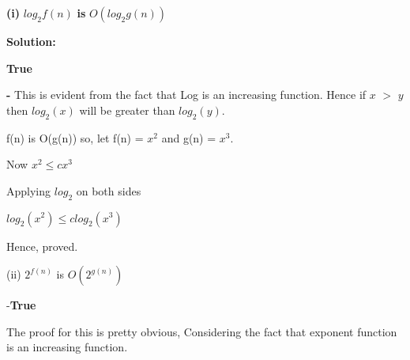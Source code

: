 \documentclass[letterpaper,portrait,12pt]{article}
\begin{document}
\begin{flushleft}
\textbf{(i) }$log_2 f(n)$\textbf{ is }$O(log_2g(n))$
\end{flushleft}


\begin{flushleft}
\textbf{S}\textbf{olution}\textbf{:}
\end{flushleft}


\begin{flushleft}
\textbf{True}
\end{flushleft}


\begin{flushleft}
\textbf{-}\textbf{ }This is evident from the fact that Log is an increasing function. Hence if $x$ $>$ $y$ then $log_2(x)$ will be greater than $log_2(y)$.
\end{flushleft}


\begin{flushleft}

\end{flushleft}


\begin{flushleft}
f(n) is O(g(n)) so, let f(n) = $x^2$ and g(n) = $x^3$.
\end{flushleft}


\begin{flushleft}

\end{flushleft}


\begin{flushleft}
Now $x^2 \le c  x^3$ 
\end{flushleft}


\begin{flushleft}
Applying $log_2$ on both sides
\end{flushleft}


\begin{flushleft}
$log_2(x^2) \le clog_2(x^3)$
\end{flushleft}


\begin{flushleft}
Hence, proved.
\end{flushleft}


\begin{flushleft}
(ii) $2^{f(n)}$ is $O(2^{g(n)})$
\end{flushleft}


\begin{flushleft}
-\textbf{True}
\end{flushleft}


\begin{flushleft}
The proof for this is pretty obvious, Considering the fact that exponent function is an increasing function.
\end{flushleft}
\end{document}
